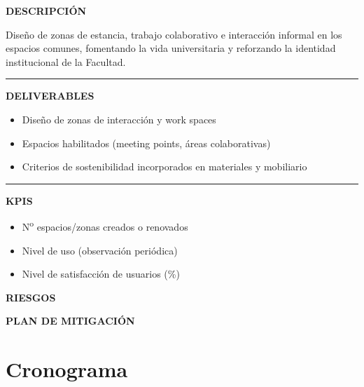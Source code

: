 \documentclass[11pt,a4paper]{scrreprt}
\newcommand{\fieldlabel}[1]{%
  {\footnotesize\sffamily\bfseries\color{mutedcolor}\MakeUppercase{#1}}\par\nopagebreak[4]
}
\newcommand{\fieldsep}{\vspace{3pt}\noindent\textcolor{bordercolor}{\rule{\linewidth}{0.4pt}}\vspace{3pt}\par}
\begin{document}
\begin{tcolorbox}[pabox={espcolor}{PA8.1 \enspace\textbullet\enspace Diseño y creación de zonas de interacción y trabajo colaborativo}]

\fieldlabel{Descripci\'on}
{\small Diseño de zonas de estancia, trabajo colaborativo e interacción informal en los espacios comunes, fomentando la vida universitaria y reforzando la identidad institucional de la Facultad.}\par
\fieldsep
\fieldlabel{Deliverables}
{\small \begin{itemize}[noitemsep,topsep=2pt]
\item Diseño de zonas de interacción y work spaces
\item Espacios habilitados (meeting points, áreas colaborativas)
\item Criterios de sostenibilidad incorporados en materiales y mobiliario
\end{itemize}}\par
\fieldsep
\fieldlabel{KPIs}
{\small \begin{itemize}[noitemsep,topsep=2pt]
\item N\textsuperscript{o} espacios/zonas creados o renovados
\item Nivel de uso (observación periódica)
\item Nivel de satisfacción de usuarios (\%)
\end{itemize}}\par
\end{tcolorbox}
\begin{tcolorbox}[riskbox]
{\footnotesize\sffamily\bfseries\color{red!50!black} RIESGOS}\par{}
\end{tcolorbox}
\begin{tcolorbox}[mitbox]
{\footnotesize\sffamily\bfseries\color{green!40!black} PLAN DE MITIGACI\'ON}\par{}
\end{tcolorbox}
\vspace{8pt}


\section{Cronograma}

\small
\end{document}
